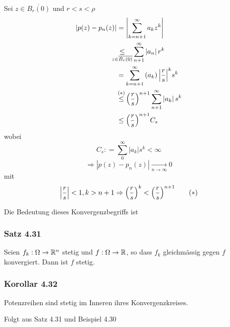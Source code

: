\begin{beweis}{}
Sei $z\in\overline{B_r(0)}$ und $r<s<\rho$
\begin{align*}
\left| {p(z) - {p_n}(z)} \right| &= \left| {\sum\limits_{k = n + 1}^\infty  {{a_k}{z^k}} } \right|\\
&\hspace{-3mm}\mathop  \le \limits_{z \in \overline {{B_r}(0)} } \sum\limits_{n + 1}^\infty  {\left| {{a_n}} \right|{r^k}} \\
& = \sum\limits_{k = n + 1}^\infty  {\left( {{a_k}} \right){{\left| {\frac{r}{s}} \right|}^k}{s^k}} \\
&\mathop  \le \limits^{{\left( \text{\textasteriskcentered} \right)}}
{\left( {\frac{r}{s}} \right)^{n + 1}}\sum\limits_{n + 1}^\infty  {\left| {{a_k}} \right|{s^k}} \\
 &\le {\left( {\frac{r}{s}} \right)^{n + 1}}{C_s}
\end{align*}
wobei
\[{C_s}: = \sum\limits_0^\infty  {\left| {{a_k}} \right|{s^k} < \infty } \]
\[\Rightarrow\left| {p(z) - {p_n}(z)} \right|\mathop  \to \limits_{n \to \infty } 0\]
mit
\[\left| {\frac{r}{s}} \right| < 1,k > n + 1 \Rightarrow {\left( {\frac{r}{s}} \right)^k} < {\left( {\frac{r}{s}} \right)^{n + 1}}\tag{\text{\textasteriskcentered}}\]
\end{beweis}
Die Bedeutung dieses Konvergenzbegriffs ist
\subsubsection*{Satz 4.31}
Seien $f_k:\Omega\to\mathbb{R}^n$ stetig und $f:\Omega\to\mathbb{R}$, so dass $f_k$ gleichmässig gegen $f$ konvergiert. Dann ist $f$ stetig.
\subsubsection*{Korollar 4.32}
Potenzreihen sind stetig im Inneren ihres Konvergenzkreises.
\begin{beweis}{}
Folgt aus Satz 4.31 und Beispiel 4.30
\end{beweis}

